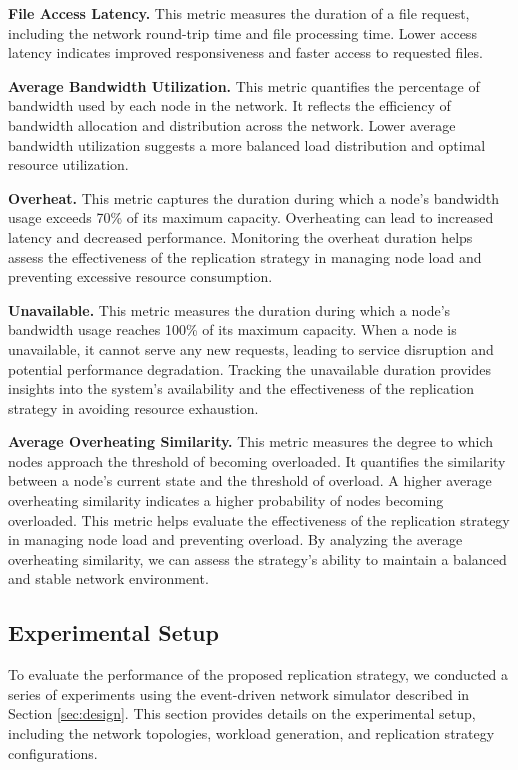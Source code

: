 \documentclass[10pt, conference]{IEEEtran}
\begin{document}
\noindent \textbf{File Access Latency.} This metric measures the duration of a file request, including the network round-trip time and file processing time. Lower access latency indicates improved responsiveness and faster access to requested files.

\noindent \textbf{Average Bandwidth Utilization.} This metric quantifies the percentage of bandwidth used by each node in the network. It reflects the efficiency of bandwidth allocation and distribution across the network. Lower average bandwidth utilization suggests a more balanced load distribution and optimal resource utilization.

\noindent \textbf{Overheat.} This metric captures the duration during which a node's bandwidth usage exceeds 70\% of its maximum capacity. Overheating can lead to increased latency and decreased performance. Monitoring the overheat duration helps assess the effectiveness of the replication strategy in managing node load and preventing excessive resource consumption.

\noindent \textbf{Unavailable.} This metric measures the duration during which a node's bandwidth usage reaches 100\% of its maximum capacity. When a node is unavailable, it cannot serve any new requests, leading to service disruption and potential performance degradation. Tracking the unavailable duration provides insights into the system's availability and the effectiveness of the replication strategy in avoiding resource exhaustion.


\noindent \textbf{Average Overheating Similarity.} This metric measures the degree to which nodes approach the threshold of becoming overloaded. It quantifies the similarity between a node's current state and the threshold of overload. A higher average overheating similarity indicates a higher probability of nodes becoming overloaded. This metric helps evaluate the effectiveness of the replication strategy in managing node load and preventing overload. By analyzing the average overheating similarity, we can assess the strategy's ability to maintain a balanced and stable network environment.

\subsection{Experimental Setup}\label{subsec:setup}
To evaluate the performance of the proposed replication strategy, we conducted a series of experiments using the event-driven network simulator described in Section \ref{sec:design}. This section provides details on the experimental setup, including the network topologies, workload generation, and replication strategy configurations.
\end{document}
